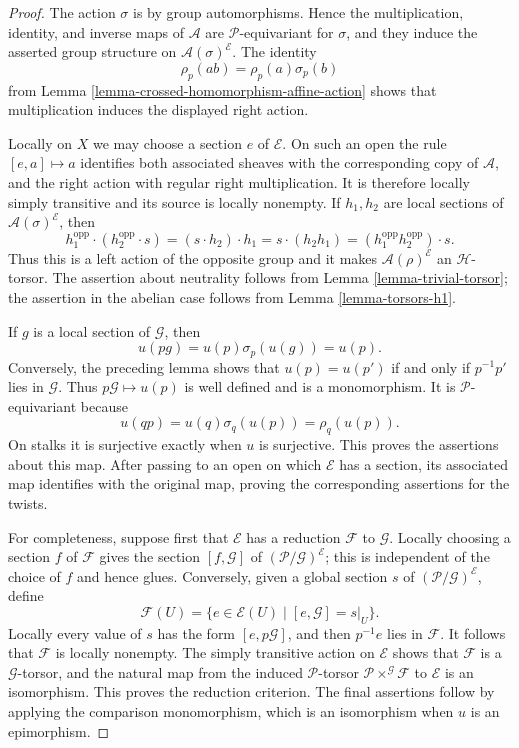\begin{proof}
The action $\sigma$ is by group automorphisms. Hence the multiplication,
identity, and inverse maps of $\mathcal{A}$ are
$\mathcal{P}$-equivariant for $\sigma$, and they induce the asserted
group structure on $\mathcal{A}(\sigma)^{\mathcal{E}}$. The identity
$$
\rho_p(ab)=\rho_p(a)\sigma_p(b)
$$
from Lemma \ref{lemma-crossed-homomorphism-affine-action} shows that
multiplication induces the displayed right action.

Locally on $X$ we may choose a section $e$ of $\mathcal{E}$. On such
an open the rule $[e,a]\mapsto a$ identifies both associated sheaves
with the corresponding copy of $\mathcal{A}$, and the right action
with regular right multiplication. It is therefore locally simply
transitive and its source is locally nonempty. If $h_1,h_2$ are local
sections of $\mathcal{A}(\sigma)^{\mathcal{E}}$, then
$$
h_1^{\mathrm{opp}}\cdot(h_2^{\mathrm{opp}}\cdot s)
=(s\cdot h_2)\cdot h_1
=s\cdot(h_2h_1)
=(h_1^{\mathrm{opp}}h_2^{\mathrm{opp}})\cdot s.
$$
Thus this is a left action of the opposite group and it makes
$\mathcal{A}(\rho)^{\mathcal{E}}$ an $\mathcal{H}$-torsor. The
assertion about neutrality follows from Lemma \ref{lemma-trivial-torsor};
the assertion in the abelian case follows from
Lemma \ref{lemma-torsors-h1}.

If $g$ is a local section of $\mathcal{G}$, then
$$
u(pg)=u(p)\sigma_p(u(g))=u(p).
$$
Conversely, the preceding lemma shows that $u(p)=u(p')$ if and only if
$p^{-1}p'$ lies in $\mathcal{G}$. Thus $p\mathcal{G}\mapsto u(p)$ is
well defined and is a monomorphism. It is $\mathcal{P}$-equivariant
because
$$
u(qp)=u(q)\sigma_q(u(p))=\rho_q(u(p)).
$$
On stalks it is surjective exactly when $u$ is surjective. This proves
the assertions about this map. After passing to an open on which
$\mathcal{E}$ has a section, its associated map identifies with the
original map, proving the corresponding assertions for the twists.

For completeness, suppose first that $\mathcal{E}$ has a reduction
$\mathcal{F}$ to $\mathcal{G}$. Locally choosing a section $f$ of
$\mathcal{F}$ gives the section $[f,\mathcal{G}]$ of
$(\mathcal{P}/\mathcal{G})^{\mathcal{E}}$; this is independent of the
choice of $f$ and hence glues. Conversely, given a global section $s$
of $(\mathcal{P}/\mathcal{G})^{\mathcal{E}}$, define
$$
\mathcal{F}(U)=
\{e\in\mathcal{E}(U)\mid [e,\mathcal{G}]=s|_U\}.
$$
Locally every value of $s$ has the form $[e,p\mathcal{G}]$, and then
$p^{-1}e$ lies in $\mathcal{F}$. It follows that $\mathcal{F}$ is
locally nonempty. The simply transitive action on $\mathcal{E}$ shows
that $\mathcal{F}$ is a $\mathcal{G}$-torsor, and the natural map from
the induced $\mathcal{P}$-torsor
$\mathcal{P}\times^{\mathcal{G}}\mathcal{F}$ to $\mathcal{E}$ is an
isomorphism. This proves the reduction criterion. The final assertions
follow by applying the comparison monomorphism, which is an isomorphism
when $u$ is an epimorphism.
\end{proof}

